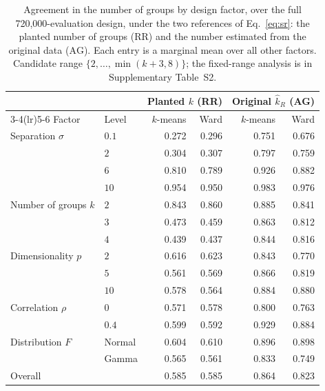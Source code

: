 \documentclass[pdflatex,sn-basic]{sn-jnl}
\begin{document}
\begin{table}[t]
\centering
\caption{Agreement in the number of groups by design factor, over the full
         720{,}000-evaluation design, under the two references of
         Eq.~\eqref{eq:sr}: the planted number of groups ($\mathrm{RR}$) and
         the number estimated from the original data ($\mathrm{AG}$). Each
         entry is a marginal mean over all other factors. Candidate range
         $\{2,\dots,\min(k+3,8)\}$; the fixed-range analysis is in
         Supplementary Table~S2.}
\label{tab:factors}
\small
\begin{tabular}{llrrrr}
\toprule
 & & \multicolumn{2}{c}{Planted $k$ (RR)} & \multicolumn{2}{c}{Original $\hat{k}_R$ (AG)} \\
\cmidrule(lr){3-4}\cmidrule(lr){5-6}
Factor & Level & $k$-means & Ward & $k$-means & Ward \\
\midrule
Separation $\sigma$ & $0.1$   & 0.272 & 0.296 & 0.751 & 0.676 \\
                    & $2$     & 0.304 & 0.307 & 0.797 & 0.759 \\
                    & $6$     & 0.810 & 0.789 & 0.926 & 0.882 \\
                    & $10$    & 0.954 & 0.950 & 0.983 & 0.976 \\
\addlinespace
Number of groups $k$ & $2$    & 0.843 & 0.860 & 0.885 & 0.841 \\
                     & $3$    & 0.473 & 0.459 & 0.863 & 0.812 \\
                     & $4$    & 0.439 & 0.437 & 0.844 & 0.816 \\
\addlinespace
Dimensionality $p$ & $2$      & 0.616 & 0.623 & 0.843 & 0.770 \\
                   & $5$      & 0.561 & 0.569 & 0.866 & 0.819 \\
                   & $10$     & 0.578 & 0.564 & 0.884 & 0.880 \\
\addlinespace
Correlation $\rho$ & $0$      & 0.571 & 0.578 & 0.800 & 0.763 \\
                   & $0.4$    & 0.599 & 0.592 & 0.929 & 0.884 \\
\addlinespace
Distribution $F$ & Normal     & 0.604 & 0.610 & 0.896 & 0.898 \\
                 & Gamma      & 0.565 & 0.561 & 0.833 & 0.749 \\
\midrule
Overall & & 0.585 & 0.585 & 0.864 & 0.823 \\
\bottomrule
\end{tabular}
\end{table}
\end{document}
